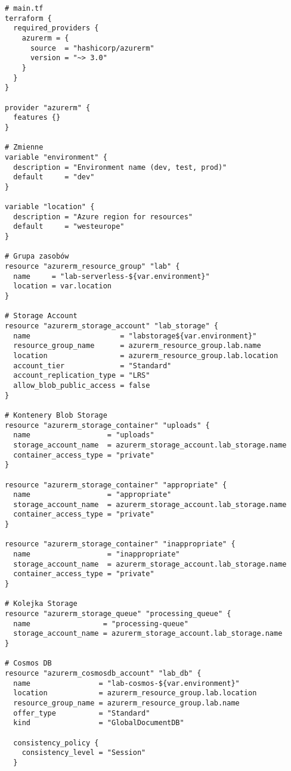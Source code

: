 \documentclass{article}
\begin{document}
\begin{lstlisting}[]
# main.tf
terraform {
  required_providers {
    azurerm = {
      source  = "hashicorp/azurerm"
      version = "~> 3.0"
    }
  }
}

provider "azurerm" {
  features {}
}

# Zmienne
variable "environment" {
  description = "Environment name (dev, test, prod)"
  default     = "dev"
}

variable "location" {
  description = "Azure region for resources"
  default     = "westeurope"
}

# Grupa zasobów
resource "azurerm_resource_group" "lab" {
  name     = "lab-serverless-${var.environment}"
  location = var.location
}

# Storage Account
resource "azurerm_storage_account" "lab_storage" {
  name                     = "labstorage${var.environment}"
  resource_group_name      = azurerm_resource_group.lab.name
  location                 = azurerm_resource_group.lab.location
  account_tier             = "Standard"
  account_replication_type = "LRS"
  allow_blob_public_access = false
}

# Kontenery Blob Storage
resource "azurerm_storage_container" "uploads" {
  name                  = "uploads"
  storage_account_name  = azurerm_storage_account.lab_storage.name
  container_access_type = "private"
}

resource "azurerm_storage_container" "appropriate" {
  name                  = "appropriate"
  storage_account_name  = azurerm_storage_account.lab_storage.name
  container_access_type = "private"
}

resource "azurerm_storage_container" "inappropriate" {
  name                  = "inappropriate"
  storage_account_name  = azurerm_storage_account.lab_storage.name
  container_access_type = "private"
}

# Kolejka Storage
resource "azurerm_storage_queue" "processing_queue" {
  name                 = "processing-queue"
  storage_account_name = azurerm_storage_account.lab_storage.name
}

# Cosmos DB
resource "azurerm_cosmosdb_account" "lab_db" {
  name                = "lab-cosmos-${var.environment}"
  location            = azurerm_resource_group.lab.location
  resource_group_name = azurerm_resource_group.lab.name
  offer_type          = "Standard"
  kind                = "GlobalDocumentDB"

  consistency_policy {
    consistency_level = "Session"
  }


\end{lstlisting}
\end{document}
